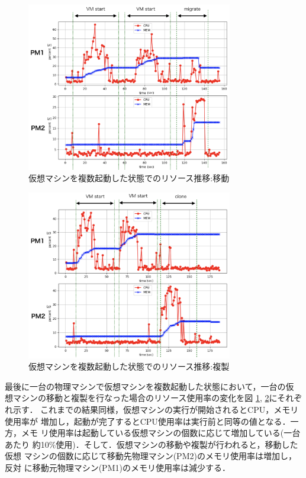 \documentclass[a4paper, twocolumn]{jarticle}
\begin{document}
\begin{figure}[t]
	\includegraphics[width=9.0cm]{fig/migrate_vm2.png}
	\caption{仮想マシンを複数起動した状態でのリソース推移:移動}
	\label{fig:graph_migrate_vm2}
\end{figure}
\begin{figure}[t]
	\includegraphics[width=9.0cm]{fig/clone_vm2.png}
	\caption{仮想マシンを複数起動した状態でのリソース推移:複製}
	\label{fig:graph_clone_vm2}
\end{figure}

最後に一台の物理マシンで仮想マシンを複数起動した状態において，一台の仮
想マシンの移動と複製を行なった場合のリソース使用率の変化を図
\ref{fig:graph_migrate_vm2}, \ref{fig:graph_clone_vm2}にそれぞれ示す．
これまでの結果同様，仮想マシンの実行が開始されるとCPU，メモリ使用率が
増加し，起動が完了するとCPU使用率は実行前と同等の値となる．一方，メモ
リ使用率は起動している仮想マシンの個数に応じて増加している(一台あたり
約10\%使用)．そして．仮想マシンの移動や複製が行われると，移動した仮想
マシンの個数に応じて移動先物理マシン(PM2)のメモリ使用率は増加し，反対
に移動元物理マシン(PM1)のメモリ使用率は減少する．
\end{document}
